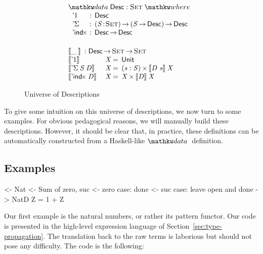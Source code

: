 \begin{figure}

\[\stk{
\begin{array}{ll}
\stk{
\data \Desc : \Set \where \\
\;\;\begin{array}{@{}l@{\::\:\:}l@{\quad}l}
    \DUnit          & \Desc \\
    \DSigma{\!}{\!} & \PI{\V{S}}{\Set} \PIS{\V{S} \To \Desc} \Desc \\
    \DIndx{\!}      & \Desc \To \Desc
\end{array}
}
\vspace{0.2in}
\\
\stk{
\descop{\_\:}{} : \Desc \To \Set \To \Set \\
\begin{array}{@{}ll@{\:=\:\:}ll}
\descop{\DUnit}{& \V{X}}        &  \Unit                                       \\
\descop{\DSigma{\V{S}}{\V{D}}}{& \V{X}} &  \SIGMAS{\V{s} : \V{S}}{\descop{\V{D}~\V{s}}{\V{X}}}         \\
\descop{\DIndx{\V{D}}}{& \V{X}}     &  \TIMES{\V{X}}{\descop{\V{D}}{\V{X}}}
\end{array}
}
\end{array}
}\]


\caption{Universe of Descriptions}
\label{fig:desc_universe}

\end{figure}

To give some intuition on this universe of descriptions, we now turn
to some examples. For obvious pedagogical reasons, we will manually
build these descriptions. However, it should be clear that, in
practice, these definitions can be automatically constructed from a
Haskell-like $\data$ definition.

\subsection{Examples}
\label{sec:desc-examples}

\begin{wstructure}
<- Nat
    <- Sum of zero, suc
    <- zero case: done
    <- suc case: leave open and done
    -> NatD Z = 1 + Z
\end{wstructure}

Our first example is the natural numbers, or rather its pattern
functor. Our code is presented in the high-level expression language
of Section~\ref{sec:type-propagation}. The translation back to the raw
terms is laborious but should not pose any difficulty. The code is the
following:

